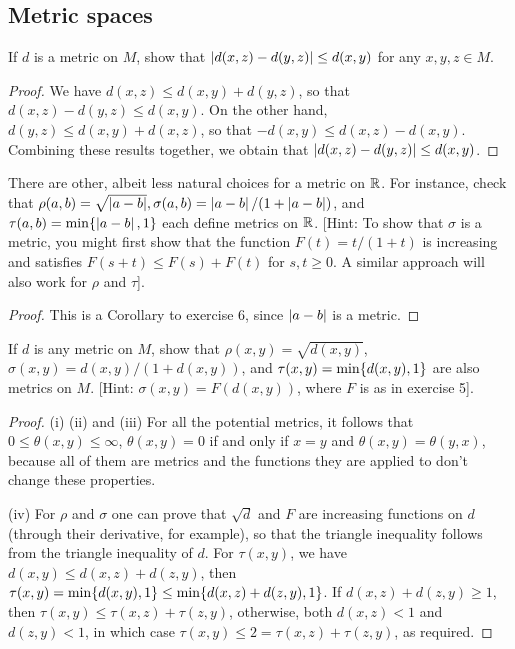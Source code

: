 \subsection{Metric spaces}


\begin{exercise}{2}
If $d$ is a metric on $M$, show that $\left\lvert d(x,z)-d(y,z)\right\rvert\leq d(x,y)$ for any $x,y,z\in M$.
\end{exercise}
\begin{proof}
We have $d(x,z)\leq d(x,y)+d(y,z)$, so that $d(x,z)-d(y,z)\leq d(x,y)$. On the other hand, $d(y,z)\leq d(x,y)+d(x,z)$, so that $-d(x,y)\leq d(x,z)-d(x,y)$. Combining these results together, we obtain that $\left\lvert d(x,z)-d(y,z)\right\rvert\leq d(x,y)$.
\end{proof} 

\begin{exercise}{5}
There are other, albeit less natural choices for a metric on $\mathbb{R}$. For instance, check that $\rho(a,b)=\sqrt{\left\lvert a-b\right\rvert},\sigma(a,b)=\left\lvert a-b\right\rvert/(1+\left\lvert a-b\right\rvert)$, and $\tau(a,b)=\min\{\left\lvert a-b\right\rvert,1\}$ each define metrics on $\mathbb{R}$. [Hint: To show that $\sigma$ is a metric, you might first show that the function $F(t)=t/(1+t)$ is increasing and satisfies $F(s+t)\leq F(s)+F(t)$ for $s,t\geq 0$. A similar approach will also work for $\rho$ and $\tau$].
\end{exercise}
\begin{proof}
This is a Corollary to exercise 6, since $\left\lvert a-b\right\rvert$ is a metric.
\end{proof} 

\begin{exercise}{6}
If $d$ is any metric on $M$, show that $\rho(x,y)=\sqrt{d(x,y)}$, $\sigma(x,y)=d(x,y)/(1+d(x,y))$, and $\tau(x,y)=\min\{d(x,y),1\}$ are also metrics on $M$. [Hint: $\sigma(x,y)=F(d(x,y))$, where $F$ is as in exercise 5].
\end{exercise}
\begin{proof}
(i) (ii) and (iii) For all the potential metrics, it follows that $0\leq \theta(x,y)\leq\infty$, $\theta(x,y)=0$ if and only if $x=y$ and $\theta(x,y)=\theta(y,x)$, because all of them are metrics and the functions they are applied to don't change these properties.

(iv) For $\rho$ and $\sigma$ one can prove that $\sqrt{d}$ and $F$ are increasing functions on $d$ (through their derivative, for example), so that the triangle inequality follows from the triangle inequality of $d$. For $\tau(x,y)$, we have $d(x,y)\leq d(x,z)+d(z,y)$, then $\tau(x,y) =\min\{d(x,y),1\}\leq \min\{d(x,z)+d(z,y),1\}$. If $d(x,z)+d(z,y)\geq 1$, then $\tau(x,y)\leq \tau(x,z)+\tau(z,y)$, otherwise, both $d(x,z)<1$ and $d(z,y)<1$, in which case $\tau(x,y)\leq 2=\tau(x,z)+\tau(z,y)$, as required.
\end{proof} 

